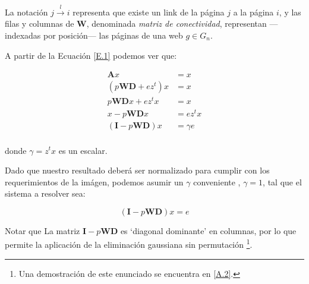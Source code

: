 \noindent La notación $j \stackrel{l}{\longrightarrow} i$ representa que existe un link de la página $j$ a la página $i$, y las filas y columnas de $\textbf{W}$, denominada \textit{matriz de conectividad}, representan ---indexadas por posición--- las páginas de una web $g \in G_n$.
\vspace{1em}

\noindent A partir de la Ecuación \ref{E.1} podemos ver que:

\begin{align*}
    \textbf{A}x &= x \\
    (p\textbf{W}\textbf{D} + ez^t)x &= x \\
    p\textbf{W}\textbf{D}x + ez^tx &= x \\
    x - p\textbf{W}\textbf{D}x &= ez^tx \\
    (\textbf{I} - p\textbf{W}\textbf{D})x &= \gamma e \\
\end{align*}

\noindent donde $\gamma = z^tx$ es un escalar.
\vspace{1em}

Dado que nuestro resultado deberá ser normalizado para cumplir con los requerimientos de la imágen, %
podemos asumir un $\gamma$ conveniente \cite{Langville04}, $\gamma = 1$, tal que el sistema a resolver sea:
\vspace{1em}

\begin{equation}\label{E.2}
    (\textbf{I} - p\textbf{W}\textbf{D})x = e
\end{equation}
\vspace{1em}

Notar que La matriz $\textbf{I} - p\textbf{W}\textbf{D}$ es `diagonal dominante' en columnas, por lo que permite la aplicación de la eliminación gaussiana sin permutación \footnote{Una demostración de este enunciado se encuentra en \ref{A.2}.}.
